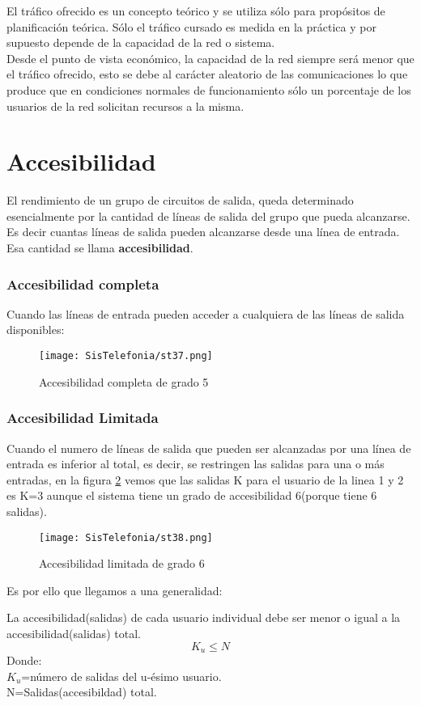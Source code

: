 \documentclass[
	11pt, %
	fleqn, %
	a4paper, %
]{LegrandOrangeBook}
\begin{document}
El tráfico ofrecido es un concepto teórico y se utiliza sólo para propósitos de planificación teórica. Sólo el tráfico cursado es medida en la práctica y por supuesto depende de la capacidad de la red o sistema.\\
Desde el punto de vista económico, la capacidad de la red siempre será menor que el tráfico ofrecido, esto se debe al carácter aleatorio de las comunicaciones lo que produce que en condiciones normales de funcionamiento sólo un porcentaje de los usuarios de la red solicitan recursos a la misma.
\section{Accesibilidad}
El rendimiento de un grupo de circuitos de salida, queda determinado esencialmente por la cantidad de líneas de salida del grupo que pueda alcanzarse.\\
Es decir cuantas líneas de salida pueden alcanzarse desde una línea de entrada. Esa cantidad se llama \textbf{accesibilidad}.
\subsubsection{Accesibilidad completa}
Cuando las líneas de entrada pueden acceder a cualquiera de las líneas de salida disponibles:
\begin{figure}[ht]
\centering\texttt{[image: SisTelefonia/st37.png]}
\caption{Accesibilidad completa de grado 5}
\label{fig:Accesibilidad completa}
\end{figure}
\subsubsection{Accesibilidad Limitada}
Cuando el numero de líneas de salida que pueden ser alcanzadas por una línea de entrada es inferior al total, es decir, se restringen las salidas para una o más entradas, en la figura \ref{fig:Accesibilidad limitada} vemos que las salidas K para el usuario de la linea 1 y 2 es K=3 aunque el sistema tiene un grado  de accesibilidad 6(porque tiene 6 salidas).
\begin{figure}[ht]
\centering\texttt{[image: SisTelefonia/st38.png]}
\caption{Accesibilidad limitada de grado 6}
\label{fig:Accesibilidad limitada}
\end{figure}
Es por ello que llegamos a una generalidad:
\begin{definition}
La accesibilidad(salidas) de cada usuario individual debe ser menor o igual a la accesibilidad(salidas) total.
\begin{equation}
K_u\leq N
\end{equation}
Donde:\\$K_u$=número de salidas del u-ésimo usuario.\\
N=Salidas(accesibildad) total.
\end{definition}
\end{document}
